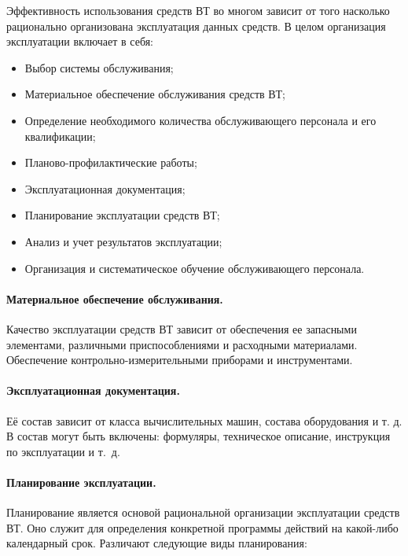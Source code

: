 \documentclass[a4paper,14pt]{extarticle}
\begin{document}
Эффективность использования средств ВТ во многом зависит от того насколько рационально организована эксплуатация данных средств. В целом организация эксплуатации включает в себя:
\begin{itemize}[label=--]
\item Выбор системы обслуживания;

\item Материальное обеспечение обслуживания средств ВТ;

\item Определение необходимого количества обслуживающего персонала и его квалификации;

\item Планово-профилактические работы;

\item Эксплуатационная документация;

\item Планирование эксплуатации средств ВТ;

\item Анализ и учет результатов эксплуатации;

\item Организация и систематическое обучение обслуживающего персонала.
\end{itemize}

\paragraph{Материальное обеспечение обслуживания.} Качество эксплуатации средств ВТ зависит от обеспечения ее запасными элементами, различными приспособлениями и расходными материалами. Обеспечение контрольно-измерительными приборами и инструментами.

\paragraph{Эксплуатационная документация.} Её состав зависит от класса вычислительных машин, состава оборудования и т. д. В состав могут быть включены: формуляры, техническое описание, инструкция по эксплуатации и т.~д.

\paragraph{Планирование эксплуатации.} Планирование является основой рациональной организации эксплуатации средств ВТ. Оно служит для определения конкретной программы действий на какой-либо календарный срок. Различают следующие виды планирования:
\end{document}
